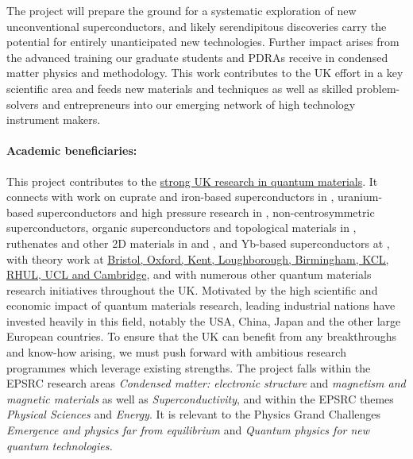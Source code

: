 The project will prepare the ground for a systematic exploration of new unconventional superconductors, and likely serendipitous discoveries carry the potential for entirely unanticipated new technologies. 
Further impact arises from the advanced training our graduate students and PDRAs receive in condensed matter physics and methodology. This
work contributes to the UK effort in a key scientific area and feeds new materials and techniques as well as skilled problem-solvers and
entrepreneurs into our emerging network of high technology instrument
makers.


\paragraph{Academic beneficiaries:}
This project contributes to the \uline{strong UK research in quantum materials}. It connects with work on cuprate and iron-based superconductors in , uranium-based superconductors and high pressure research in , non-centrosymmetric superconductors, organic superconductors and topological materials in , ruthenates and other 2D materials in  and , and Yb-based superconductors at , with theory work at \ul{Bristol, Oxford, Kent, Loughborough, Birmingham, KCL, RHUL, UCL and Cambridge}, and with numerous other quantum materials research initiatives throughout the UK.   
Motivated by  
the high scientific and economic impact of quantum materials research, leading industrial nations have
invested heavily in this field, notably the USA, China, Japan and the
other large European countries. 
To ensure that the UK 
can benefit from any breakthroughs and know-how arising, we must push
forward with ambitious research programmes which leverage existing
strengths. The project falls within the EPSRC research areas {\em Condensed matter: electronic structure} and  {\em magnetism and magnetic materials} as well as {\em Superconductivity}, and within the EPSRC themes {\em Physical Sciences}  and {\em Energy}. It is relevant to the Physics Grand Challenges {\em Emergence and physics far from equilibrium} and 
{\em Quantum physics for new quantum technologies.} 

